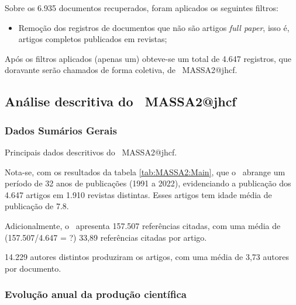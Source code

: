 Sobre os 6.935 documentos recuperados, foram  aplicados os seguintes filtros:
\begin{itemize}
    \item Remoção dos registros de documentos que não são artigos \textit{full paper}, isso é, artigos completos publicados em revistas;
\end{itemize}

Após os filtros aplicados (apenas um)  obteve-se um total de 4.647 registros, que doravante serão chamados de forma coletiva, de \dataset\   MASSA2@jhcf.

\subsection{Análise descritiva do \dataset\   MASSA2@jhcf}

\subsubsection{Dados Sumários Gerais}

\begin{table}[htp]
    \centering
{}
    \caption{Principais dados descritivos do \dataset\   MASSA2@jhcf.}
    \label{tab:MASSA2:Main}
\end{table}

Nota-se, com os resultados da tabela \ref{tab:MASSA2:Main}, que o \dataset\   abrange um período de 32 anos de publicações (1991 a 2022), evidenciando  a publicação dos 4.647 artigos em 1.910 revistas distintas. Esses artigos tem idade média de publicação de 7.8.

Adicionalmente, o \dataset\ apresenta 157.507 referências citadas, com uma média de (157.507/4.647 = ?) 33,89 referências citadas por artigo.

14.229 autores distintos produziram os artigos, com uma média de 3,73 autores por documento.

\subsubsection{Evolução anual da produção científica}


